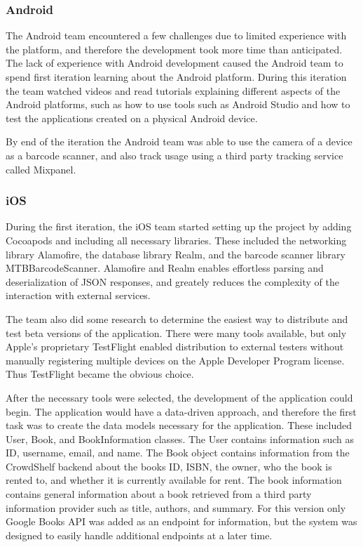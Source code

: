 \subsubsection{Android}
The Android team encountered a few challenges due to limited experience with the platform, and therefore the development took more time than anticipated. The lack of experience with Android development caused the Android team to spend first iteration learning about the Android platform. During this iteration the team watched videos and read tutorials explaining different aspects of the Android platforms, such as how to use tools such as Android Studio and how to test the applications created on a physical Android device.\cite{android-studios}

By end of the iteration the Android team was able to use the camera of a device as a barcode scanner, and also track usage using a third party tracking service called Mixpanel.\cite{mixpanel}

\subsubsection{iOS}
During the first iteration, the iOS team started setting up the project by adding Cocoapods and including all necessary libraries. \cite{cocoapods} These included the networking library Alamofire, the database library Realm, and the barcode scanner library MTBBarcodeScanner. \cite{alamofire}\cite{realm}\cite{mtbbarcodescanner} Alamofire and Realm enables effortless parsing and deserialization of \gls{JSON} responses, and greately reduces the complexity of the interaction with external services.  \cite{json}

The team also did some research to determine the easiest way to distribute and test beta versions of the application. There were many tools available, but only Apple's proprietary TestFlight enabled distribution to external testers without manually registering multiple devices on the Apple Developer Program license. \cite{testflight}\cite{apple-developer-program} Thus TestFlight became the obvious choice.

After the necessary tools were selected, the development of the application could begin. The application would have a data-driven approach, and therefore the first task was to create the data models necessary for the application. \cite{data-driven-programming} These included User, Book, and BookInformation classes. The User contains information such as \gls{ID}, username, email, and name. The Book object contains information from the CrowdShelf backend about the books \gls{ID}, \gls{ISBN}, the owner, who the book is rented to, and whether it is currently available for rent. The book information contains general information about a book retrieved from a third party information provider such as title, authors, and summary. For this version only Google Books \gls{API} was added as an endpoint for information, but the system was designed to easily handle additional endpoints at a later time.\cite{google-books-api}

